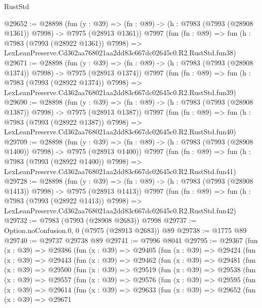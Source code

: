 \begin{lexlean}{RustStd}
\begin{coremodule}
@29652 := @28898
    (fun (y : @39) =>
    (fn : @89) -> (h : @7983 (@7993 (@28908 @1361)) @7998) -> @7975 (@28913 @1361))
    @7997
    (fun (fn : @89) =>
    fun (h : @7983 (@7993 (@28922 @1361)) @7998) =>
    LexLeanPreserve.Cd362aa768021aa2dd83c667dc02645c0.R2.RustStd.fun38)
@29671 := @28898
    (fun (y : @39) =>
    (fn : @89) -> (h : @7983 (@7993 (@28908 @1374)) @7998) -> @7975 (@28913 @1374))
    @7997
    (fun (fn : @89) =>
    fun (h : @7983 (@7993 (@28922 @1374)) @7998) =>
    LexLeanPreserve.Cd362aa768021aa2dd83c667dc02645c0.R2.RustStd.fun39)
@29690 := @28898
    (fun (y : @39) =>
    (fn : @89) -> (h : @7983 (@7993 (@28908 @1387)) @7998) -> @7975 (@28913 @1387))
    @7997
    (fun (fn : @89) =>
    fun (h : @7983 (@7993 (@28922 @1387)) @7998) =>
    LexLeanPreserve.Cd362aa768021aa2dd83c667dc02645c0.R2.RustStd.fun40)
@29709 := @28898
    (fun (y : @39) =>
    (fn : @89) -> (h : @7983 (@7993 (@28908 @1400)) @7998) -> @7975 (@28913 @1400))
    @7997
    (fun (fn : @89) =>
    fun (h : @7983 (@7993 (@28922 @1400)) @7998) =>
    LexLeanPreserve.Cd362aa768021aa2dd83c667dc02645c0.R2.RustStd.fun41)
@29728 := @28898
    (fun (y : @39) =>
    (fn : @89) -> (h : @7983 (@7993 (@28908 @1413)) @7998) -> @7975 (@28913 @1413))
    @7997
    (fun (fn : @89) =>
    fun (h : @7983 (@7993 (@28922 @1413)) @7998) =>
    LexLeanPreserve.Cd362aa768021aa2dd83c667dc02645c0.R2.RustStd.fun42)
@29732 := @7983 (@7993 (@28908 @2683)) @7998
@29737 := Option.noConfusion.{0, 0} (@7975 (@28913 @2683)) @89
@29738 := @1775 @89
@29740 := @29737 @29738 @89
@29741 := @7996 @8041
@29795 := @29367
    (fun (x : @39) =>
    @29386
      (fun (x : @39) =>
      @29405
        (fun (x : @39) =>
        @29424
          (fun (x : @39) =>
          @29443
            (fun (x : @39) =>
            @29462
              (fun (x : @39) =>
              @29481
                (fun (x : @39) =>
                @29500
                  (fun (x : @39) =>
                  @29519
                    (fun (x : @39) =>
                    @29538
                      (fun (x : @39) =>
                      @29557
                        (fun (x : @39) =>
                        @29576
                          (fun (x : @39) =>
                          @29595
                            (fun (x : @39) =>
                            @29614
                              (fun (x : @39) =>
                              @29633
                                (fun (x : @39) =>
                                @29652
                                  (fun (x : @39) =>
                                  @29671

\end{coremodule}
\end{lexlean}
